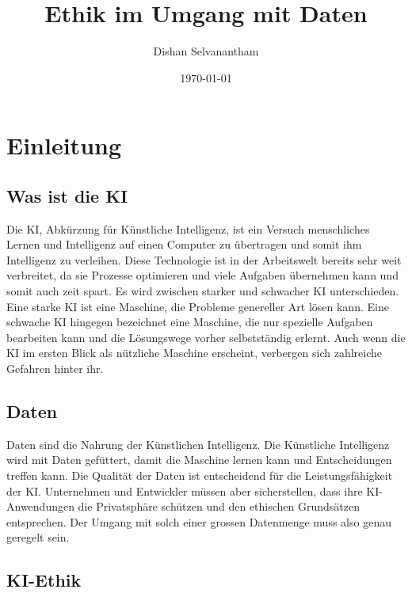 \documentclass{report}
\title{Ethik im Umgang mit Daten}
\author{Dishan Selvanantham}
\date{\today}
\begin{document}
\maketitle


\tableofcontents

\chapter{Einleitung}

\section{Was ist die KI}

Die KI, Abkürzung für Künstliche Intelligenz, ist ein Versuch menschliches Lernen und Intelligenz auf einen Computer zu übertragen und somit ihm Intelligenz zu verleihen. Diese Technologie ist in der Arbeitswelt bereits sehr weit verbreitet, da sie Prozesse optimieren und viele Aufgaben übernehmen kann und somit auch zeit spart. Es wird zwischen starker und schwacher KI unterschieden. Eine starke KI ist eine Maschine, die Probleme genereller Art lösen kann. Eine schwache KI hingegen bezeichnet eine Maschine, die nur spezielle Aufgaben bearbeiten kann und die Lösungswege vorher selbstständig erlernt. Auch wenn die KI im ersten Blick als nützliche Maschine erscheint, verbergen sich zahlreiche Gefahren hinter ihr.

\section{Daten}

Daten sind die Nahrung der Künstlichen Intelligenz. Die Künstliche Intelligenz wird mit Daten gefüttert, damit die Maschine lernen kann und Entscheidungen treffen kann. Die Qualität der Daten ist entscheidend für die Leistungsfähigkeit der KI. Unternehmen und Entwickler müssen aber sicherstellen, dass ihre KI- Anwendungen die Privatsphäre schützen und den ethischen Grundsätzen entsprechen. Der Umgang mit solch einer grossen Datenmenge muss also genau geregelt sein.

\section{KI-Ethik}
\end{document}
